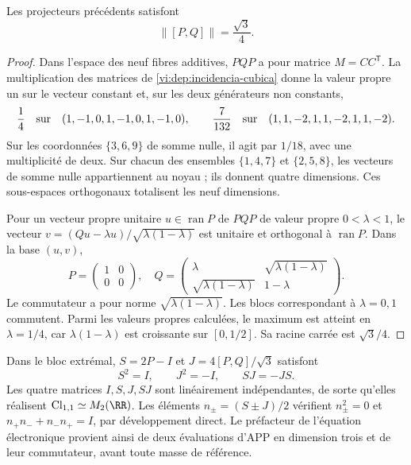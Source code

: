\begin{proposition}
\label{vi:dep:norma-PQ}
Les projecteurs précédents satisfont
\begin{equation}
 \|[P,Q]\|=\frac{\sqrt3}{4}.
 \label{vi:dep:prefactor-valor}
\end{equation}
\end{proposition}
\begin{proof}
Dans l’espace des neuf fibres additives, \(PQP\) a pour matrice
\(M=CC^{\mathsf T}\). La multiplication des matrices de
\eqref{vi:dep:incidencia-cubica} donne la valeur propre un sur le vecteur
constant et, sur les deux générateurs non constants,
\[
 \frac14\quad\hbox{sur}\quad(1,-1,0,1,-1,0,1,-1,0),
 \qquad
 \frac7{132}\quad\hbox{sur}\quad(1,1,-2,1,1,-2,1,1,-2).
\]
Sur les coordonnées \(\{3,6,9\}\) de somme nulle, il agit par
\(1/18\), avec une multiplicité de deux. Sur chacun des ensembles
\(\{1,4,7\}\) et \(\{2,5,8\}\), les vecteurs de somme nulle
appartiennent au noyau ; ils donnent quatre dimensions. Ces sous-espaces
orthogonaux totalisent les neuf dimensions.

Pour un vecteur propre unitaire \(u\in\operatorname{ran}P\) de
\(PQP\) de valeur propre \(0<\lambda<1\), le vecteur
\(v=(Qu-\lambda u)/\sqrt{\lambda(1-\lambda)}\) est unitaire et
orthogonal à \(\operatorname{ran}P\). Dans la base \((u,v)\),
\[
 P=\begin{pmatrix}1&0\\0&0\end{pmatrix},\quad
 Q=\begin{pmatrix}\lambda&\sqrt{\lambda(1-\lambda)}\\
 \sqrt{\lambda(1-\lambda)}&1-\lambda\end{pmatrix}.
\]
Le commutateur a pour norme \(\sqrt{\lambda(1-\lambda)}\).
Les blocs correspondant à \(\lambda=0,1\) commutent. Parmi les
valeurs propres calculées, le maximum est atteint en \(\lambda=1/4\),
car \(\lambda(1-\lambda)\) est croissante sur \([0,1/2]\).
Sa racine carrée est \(\sqrt3/4\).
\end{proof}

Dans le bloc extrémal, \(S=2P-I\) et
\(J=4[P,Q]/\sqrt3\) satisfont
\[
 S^2=I,\qquad J^2=-I,\qquad SJ=-JS.
\]
Les quatre matrices \(I,S,J,SJ\) sont linéairement indépendantes,
de sorte qu’elles réalisent \(\mathrm{Cl}_{1,1}\simeq M_2(\RR)\).
Les éléments \(n_\pm=(S\pm J)/2\) vérifient
\(n_\pm^2=0\) et \(n_+n_-+n_-n_+=I\), par développement direct.
Le préfacteur de l’équation électronique provient ainsi de deux évaluations
d’APP en dimension trois et de leur commutateur, avant toute masse
de référence.

